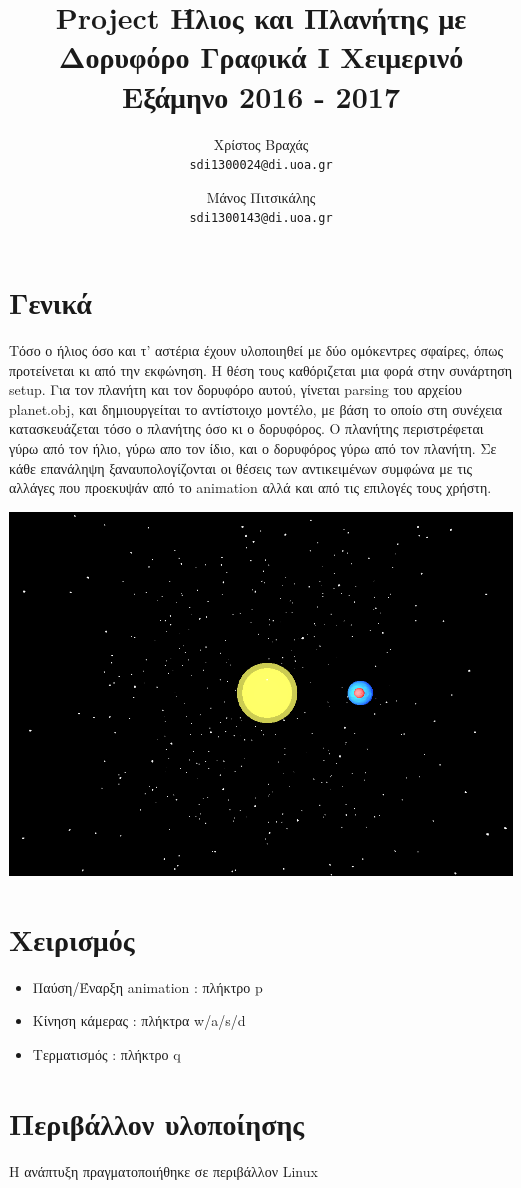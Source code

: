 \documentclass[12pt]{article}
\title{Project Ήλιος και Πλανήτης με Δορυφόρο Γραφικά Ι Χειμερινό Εξάμηνο 2016 - 2017}
\author{Χρίστος Βραχάς\\
  \texttt{sdi1300024@di.uoa.gr}
  \and Μάνος Πιτσικάλης\\
  \texttt{sdi1300143@di.uoa.gr}}
\date{}
\begin{document}
\maketitle


\section{Γενικά}

Τόσο ο ήλιος όσο και τ' αστέρια έχουν υλοποιηθεί με δύο ομόκεντρες σφαίρες, όπως προτείνεται κι από την εκφώνηση. Η θέση τους καθόριζεται μια φορά στην συνάρτηση setup.
Για τον πλανήτη και τον δορυφόρο αυτού, γίνεται parsing του αρχείου planet.obj, και δημιουργείται το αντίστοιχο μοντέλο, με βάση το οποίο στη συνέχεια
κατασκευάζεται τόσο ο πλανήτης όσο κι ο δορυφόρος. Ο πλανήτης περιστρέφεται γύρω από τον ήλιο, γύρω απο τον ίδιο, και ο δορυφόρος γύρω από τον πλανήτη. Σε κάθε επανάληψη ξαναυπολογίζονται οι θέσεις των αντικειμένων συμφώνα με τις αλλάγες που προεκυψάν από το animation αλλά και από τις επιλογές τους χρήστη.

\includegraphics[scale=0.5]{graphics.png}

\section{Χειρισμός}

\begin{itemize}
    \item Παύση/Έναρξη animation : πλήκτρο p
    \item Κίνηση κάμερας : πλήκτρα w/a/s/d
    \item Τερματισμός : πλήκτρο q
\end{itemize}

\section{Περιβάλλον υλοποίησης}

Η ανάπτυξη πραγματοποιήθηκε σε περιβάλλον Linux
\end{document}
